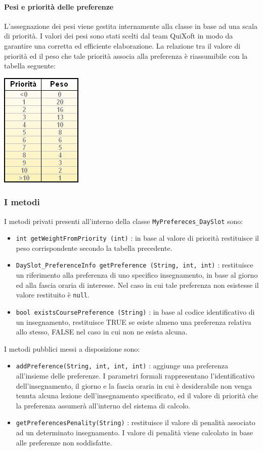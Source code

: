 \documentclass[11pt,a4paper]{article}
\begin{document}
\paragraph{Pesi e priorità delle preferenze}
L'assegnazione dei pesi viene gestita internamente alla classe in base ad una scala di priorità. I valori dei pesi sono stati scelti dal team QuiXoft in modo da garantire una corretta ed efficiente elaborazione. La relazione tra il valore di priorità ed il peso che tale priorità associa alla preferenza è riassumibile con la tabella seguente:

\includegraphics[scale=1]{images/Algoritm_WeightPriorityRelation.png}
\subsubsection*{I metodi}
I metodi privati presenti all'interno della classe \verb|MyPrefereces_DaySlot| sono:
\begin{itemize}
\item \verb|int getWeightFromPriority (int)| : in base al valore di priorità restituisce il peso corrispondente secondo la tabella precedente.
\item \verb|DaySlot_PreferenceInfo getPreference (String, int, int)| : restituisce un riferimento alla preferenza di uno specifico insegnamento, in base al giorno ed alla fascia oraria di interesse. Nel caso in cui tale preferenza non esistesse il valore restituito è \verb|null|.
\item \verb|bool existsCoursePreference (String)| : in base al codice identificativo di un insegnamento, restituisce TRUE se esiste almeno una preferenza relativa allo stesso, FALSE nel caso in cui non ne esista alcuna. 
\end{itemize}

I metodi pubblici messi a disposizione sono:
\begin{itemize}
\item \verb|addPreference(String, int, int, int)| : aggiunge una preferenza all'insieme delle preferenze. I parametri formali rappresentano l'identificativo dell'insegnamento, il giorno e la fascia oraria in cui è desiderabile non venga tenuta alcuna lezione dell'insegnamento specificato, ed il valore di priorità che la preferenza assumerà all'interno del sistema di calcolo.
\item \verb|getPreferencesPenality(String)| : restituisce il valore di penalità associato ad un determinato insegnamento. I valore di penalità viene calcolato in base alle preferenze non soddisfatte.
\end{itemize}
\end{document}
